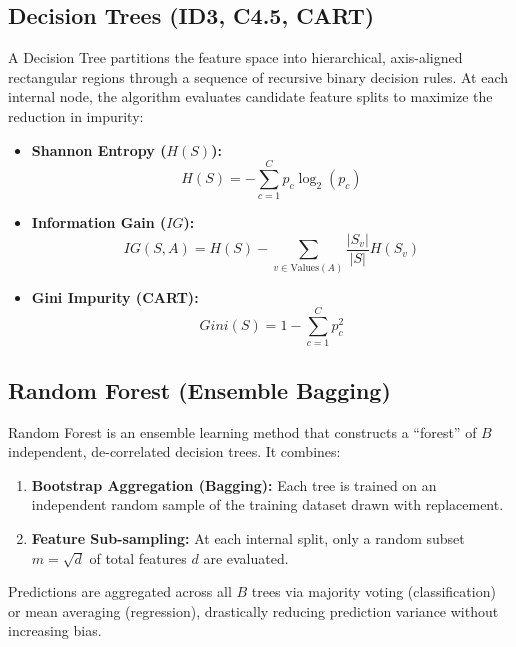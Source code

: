 \subsection{Decision Trees (ID3, C4.5, CART)}
A Decision Tree partitions the feature space into hierarchical, axis-aligned rectangular regions through a sequence of recursive binary decision rules. At each internal node, the algorithm evaluates candidate feature splits to maximize the reduction in impurity:
\begin{itemize}
    \item \textbf{Shannon Entropy ($H(S)$):}
    \begin{equation}
    H(S) = -\sum_{c=1}^C p_c \log_2(p_c)
    \end{equation}
    \item \textbf{Information Gain ($IG$):}
    \begin{equation}
    IG(S, A) = H(S) - \sum_{v \in \text{Values}(A)} \frac{|S_v|}{|S|} H(S_v)
    \end{equation}
    \item \textbf{Gini Impurity (CART):}
    \begin{equation}
    Gini(S) = 1 - \sum_{c=1}^C p_c^2
    \end{equation}
\end{itemize}

\subsection{Random Forest (Ensemble Bagging)}
Random Forest is an ensemble learning method that constructs a ``forest'' of $B$ independent, de-correlated decision trees. It combines:
\begin{enumerate}
    \item \textbf{Bootstrap Aggregation (Bagging):} Each tree is trained on an independent random sample of the training dataset drawn with replacement.
    \item \textbf{Feature Sub-sampling:} At each internal split, only a random subset $m = \sqrt{d}$ of total features $d$ are evaluated.
\end{enumerate}
Predictions are aggregated across all $B$ trees via majority voting (classification) or mean averaging (regression), drastically reducing prediction variance without increasing bias.

